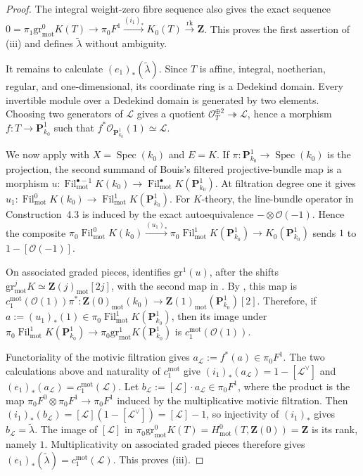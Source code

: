 \documentclass[10pt]{amsart}
\newcommand{\gr}{\mathrm{gr}}
\DeclareMathOperator{\Spec}{Spec}
\newcommand{\mot}{\operatorname{mot}}
\newcommand{\Fil}{\operatorname{Fil}}
\theoremstyle{remark}
\begin{document}
\begin{proof}
	The integral weight-zero fibre sequence also gives the exact sequence
	\(
	0=\pi_1\gr^0_{\mot}K(T)\to\pi_0F^1
	\xrightarrow{(i_1)_*}K_0(T)\xrightarrow{\operatorname{rk}}\mathbf Z
	\). This proves the first assertion of \textup{(iii)} and defines
	\(\widetilde\lambda\) without ambiguity.
	
	It remains to calculate \((e_1)_*(\widetilde\lambda)\). Since \(T\) is
	affine, integral, noetherian, regular, and one-dimensional, its
	coordinate ring is a Dedekind domain. Every invertible module over a
	Dedekind domain is generated by two elements. Choosing two generators of
	\(\mathcal L\) gives a quotient \(\mathcal O_T^{\oplus2}\twoheadrightarrow
	\mathcal L\), hence a morphism \(f\colon T\to\mathbf P^1_{k_0}\) such that
	\(f^*\mathcal O_{\mathbf P^1_{k_0}}(1)\simeq\mathcal L\).
	
	We now apply \cite[Constr.~4.3 and Rem.~4.4]
	{BouisWeibelVanishingPBF} with \(X=\Spec({k_0})\) and \(E=K\). If
	\(\pi\colon\mathbf P^1_{k_0}\to\Spec({k_0})\) is the projection, the second
	summand of Bouis's filtered projective-bundle map is a morphism
	\(
	u\colon\Fil^{\bullet-1}_{\mot}K({k_0})\to
	\Fil^\bullet_{\mot}K(\mathbf P^1_{k_0})
	\). At filtration degree one it gives
	\(u_1\colon\Fil^0_{\mot}K({k_0})\to
	\Fil^1_{\mot}K(\mathbf P^1_{k_0})\). For \(K\)-theory, the line-bundle
	operator in Construction~4.3 is induced by the exact autoequivalence
	\(-\otimes\mathcal O(-1)\). Hence the composite
	\(
	\pi_0\Fil^0_{\mot}K({k_0})\xrightarrow{(u_1)_*}
	\pi_0\Fil^1_{\mot}K(\mathbf P^1_{k_0})\to K_0(\mathbf P^1_{k_0})
	\)
	sends \(1\) to \(1-[\mathcal O(-1)]\).
	
	On associated graded pieces, \cite[Rem.~4.4]
	{BouisWeibelVanishingPBF} identifies \(\gr^1(u)\), after the shifts
	\(\gr^j_{\mot}K\simeq\mathbf Z(j)_{\mot}[2j]\), with the second map in
	\cite[(4.2.1)]{BouisWeibelVanishingPBF}. By
	\cite[Def.~4.1 and Rem.~4.2]{BouisWeibelVanishingPBF}, this map is
	\(
	c_1^{\mot}(\mathcal O(1))\pi^*\colon
	\mathbf Z(0)_{\mot}({k_0})\to
	\mathbf Z(1)_{\mot}(\mathbf P^1_{k_0})[2]
	\). Therefore, if
	\(a:=(u_1)_*(1)\in
	\pi_0\Fil^1_{\mot}K(\mathbf P^1_{k_0})\), then its image under
	\(\pi_0\Fil^1_{\mot}K(\mathbf P^1_{k_0})\to
	\pi_0\gr^1_{\mot}K(\mathbf P^1_{k_0})\) is
	\(c_1^{\mot}(\mathcal O(1))\).
	
	Functoriality of the motivic filtration gives
	\(a_{\mathcal L}:=f^*(a)\in\pi_0F^1\). The two calculations above and
	naturality of \(c_1^{\mot}\) give
	\((i_1)_*(a_{\mathcal L})=1-[\mathcal L^\vee]\) and
	\((e_1)_*(a_{\mathcal L})=c_1^{\mot}(\mathcal L)\). Let
	\(b_{\mathcal L}:=[\mathcal L]\cdot a_{\mathcal L}\in\pi_0F^1\),
	where the product is the map
	\(\pi_0F^0\otimes\pi_0F^1\to\pi_0F^1\) induced by the multiplicative
	motivic filtration. Then
	\((i_1)_*(b_{\mathcal L})=[\mathcal L](1-[\mathcal L^\vee])
	=[\mathcal L]-1\), so injectivity of \((i_1)_*\) gives
	\(b_{\mathcal L}=\widetilde\lambda\). The image of \([\mathcal L]\)
	in \(\pi_0\gr^0_{\mot}K(T)=H^0_{\mot}(T,\mathbf Z(0))=\mathbf Z\)
	is its rank, namely \(1\). Multiplicativity on associated graded pieces
	therefore gives \((e_1)_*(\widetilde\lambda)
	=c_1^{\mot}(\mathcal L)\). This proves \textup{(iii)}.
	

\end{proof}
\end{document}
